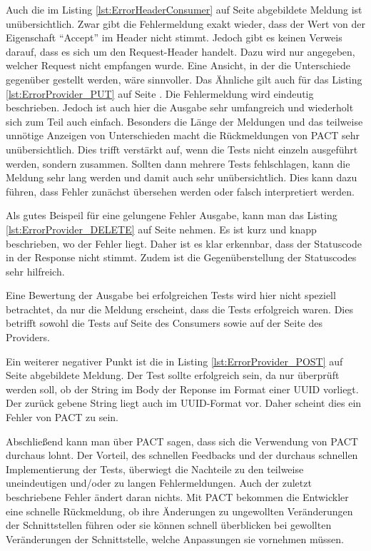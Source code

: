 \documentclass{llncs}
\begin{document}
Auch die im Listing \ref{lst:ErrorHeaderConsumer} auf Seite \pageref{lst:ErrorHeaderConsumer} abgebildete Meldung ist unübersichtlich. Zwar gibt die Fehlermeldung exakt wieder, dass der Wert von der Eigenschaft \enquote{Accept} im Header nicht stimmt. Jedoch gibt es keinen Verweis darauf, dass es sich um den Request-Header handelt. Dazu wird nur angegeben, welcher Request nicht empfangen wurde. Eine Ansicht, in der die Unterschiede gegenüber gestellt werden, wäre sinnvoller.
Das Ähnliche gilt auch für das Listing \ref{lst:ErrorProvider_PUT} auf Seite \pageref{lst:ErrorProvider_PUT}. Die Fehlermeldung wird eindeutig beschrieben. Jedoch ist auch hier die Ausgabe sehr umfangreich und wiederholt sich zum Teil auch einfach. Besonders die Länge der Meldungen und das teilweise unnötige Anzeigen von Unterschieden macht die Rückmeldungen von PACT sehr unübersichtlich. Dies trifft verstärkt auf, wenn die Tests nicht einzeln ausgeführt werden, sondern zusammen. Sollten dann mehrere Tests fehlschlagen, kann die Meldung sehr lang werden und damit auch sehr unübersichtlich. Dies kann dazu führen, dass Fehler zunächst übersehen werden oder falsch interpretiert werden.

Als gutes Beispeil für eine gelungene Fehler Ausgabe, kann man das Listing \ref{lst:ErrorProvider_DELETE} auf Seite \pageref{lst:ErrorProvider_DELETE} nehmen. Es ist kurz und knapp beschrieben, wo der Fehler liegt. Daher ist es klar erkennbar, dass der Statuscode in der Response nicht stimmt. Zudem ist die Gegenüberstellung der Statuscodes sehr hilfreich.

Eine Bewertung der Ausgabe bei erfolgreichen Tests wird hier nicht speziell betrachtet, da nur die Meldung erscheint, dass die Tests erfolgreich waren. Dies betrifft sowohl die Tests auf Seite des Consumers sowie auf der Seite des Providers.

Ein weiterer negativer Punkt ist die in Listing \ref{lst:ErrorProvider_POST} auf Seite \pageref{lst:ErrorProvider_POST} abgebildete Meldung. Der Test sollte erfolgreich sein, da nur überprüft werden soll, ob der String im Body der Reponse im Format einer UUID vorliegt. Der zurück gebene String liegt auch im UUID-Format vor. Daher scheint dies ein Fehler von PACT zu sein. 

Abschließend kann man über PACT sagen, dass sich die Verwendung von PACT durchaus lohnt. Der Vorteil, des schnellen Feedbacks und der durchaus schnellen Implementierung der Tests, überwiegt die Nachteile zu den teilweise uneindeutigen und/oder zu langen Fehlermeldungen. Auch der zuletzt beschriebene Fehler ändert daran nichts. Mit PACT bekommen die Entwickler eine schnelle Rückmeldung, ob ihre Änderungen zu ungewollten Veränderungen der Schnittstellen führen oder sie können schnell überblicken bei gewollten Veränderungen der Schnittstelle, welche Anpassungen sie vornehmen müssen.
\end{document}
